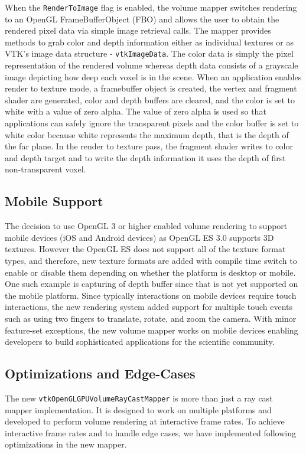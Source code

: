 When the \texttt{RenderToImage} flag is enabled, the volume mapper switches
rendering to an OpenGL FrameBufferObject (FBO) and allows the user to obtain the
rendered pixel data via simple image retrieval calls. The mapper provides
methods to grab color and depth information either as individual textures or as
VTK's image data structure - \texttt{vtkImageData}. The color data is simply the
pixel representation of the rendered volume whereas depth data consists of a
grayscale image depicting how deep each voxel is in the scene. When an
application enables render to texture mode, a framebuffer object is created, the
vertex and fragment shader are generated, color and depth buffers are cleared,
and the color is set to white with a value of zero alpha. The value of zero
alpha is used so that applications can safely ignore the transparent pixels and
the color buffer is set to white color because white represents the maximum
depth, that is the depth of the far plane. In the render to texture pass, the
fragment shader writes to color and depth target and to write the depth
information it uses the depth of first non-transparent voxel.

\subsection{Mobile Support}
The decision to use OpenGL 3 or higher enabled volume rendering to support
mobile devices (iOS and Android devices) as OpenGL ES 3.0 supports 3D textures.
However the OpenGL ES does not support all of the texture format types, and
therefore, new texture formats are added with compile time switch to enable or
disable them depending on whether the platform is desktop or mobile. One such
example is capturing of depth buffer since that is not yet supported on the
mobile platform.  Since typically interactions on mobile devices require touch
interactions, the new rendering system added support for multiple touch events
such as using two fingers to translate, rotate, and zoom the camera. With minor
feature-set exceptions, the new volume mapper works on mobile devices enabling
developers to build sophisticated applications for the scientific community.

\subsection{Optimizations and Edge-Cases} The new
\texttt{vtkOpenGLGPUVolumeRayCastMapper} is more than just a ray cast mapper
implementation. It is designed to work on multiple platforms and developed to
perform volume rendering at interactive frame rates. To achieve interactive
frame rates and to handle edge cases, we have implemented following
optimizations in the new mapper.

